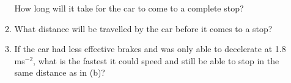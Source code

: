 \documentclass[12pt, letterpaper]{article}
\begin{document}
\begin{enumerate}[itemsep=6cm]
\begin{enumerate}[itemsep=6cm]
        How long will it take for the car to come to a complete stop? 

        \item 
        What distance will be travelled by the car before it comes to a stop?

        \item 
        If the car had less effective brakes and was only able to decelerate at 1.8 ms$^{-2}$, what is the fastest it could speed and still be able to stop in the same distance as in (b)?
    \end{enumerate}


\end{enumerate}
\end{document}
